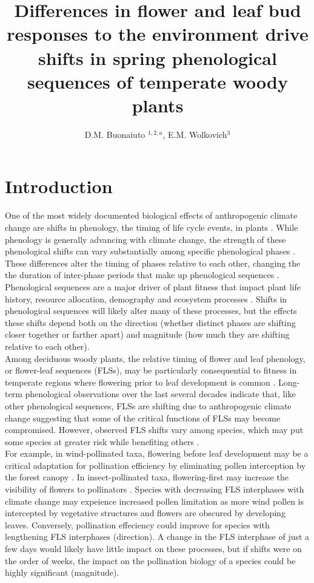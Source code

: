 \documentclass[11pt]{article}
\title{Differences in flower and leaf bud responses to the environment drive shifts in spring phenological sequences of temperate woody plants}\\
\date{}
\author{D.M. Buonaiuto $^{1,2,a}$, E.M. Wolkovich$^{3}$}
\begin{document}
\maketitle
\section*{Introduction}
One of the most widely documented biological effects of anthropogenic climate change are shifts in phenology, the timing of life cycle events, in plants \citep{}. While phenology is generally advancing with climate change, the strength of these phenological shifts can vary substantially among specific phenological phases \citep{}. These differences alter the timing of phases relative to each other, changing the the duration of inter-phase periods that make up phenological sequences \citep{}. Phenological sequences are a major driver of plant fitness that impact plant life history, resource allocation, demography and ecosystem processes \citep{}. Shifts in phenological sequences will likely alter many of these processes, but the effects these shifts depend both on the direction (whether distinct phases are shifting closer together or farther apart) and magnitude (how much they are shifting relative to each other).\\

Among deciduous woody plants, the relative timing of flower and leaf phenology, or flower-leaf sequences (FLSs), may be particularly consequential to fitness in temperate regions where flowering prior to leaf development is common \citep{Rathcke_1985,Gougherty2018}. Long-term phenological observations over the last several decades indicate that, like other phenological sequences, FLSs are shifting due to anthropogenic climate change \citep{Buonaiuto2020} suggesting that some of the critical functions of FLSs may become compromised. However, observed FLS shifts vary among species, which may put some species at greater risk while benefiting others \citep{Buonaiuto2020}.\\  

For example, in wind-pollinated taxa, flowering before leaf development may be a critical adaptation for pollination efficiency by eliminating pollen interception by the forest canopy \citep{Whitehead1969}. In insect-pollinated taxa, flowering-first may increase the visibility of flowers to pollinators \citep{Janzen1967,Savage2019}. Species with decreasing FLS interphases with climate change may expeience increased pollen limitation as more wind pollen is intercepted by vegetative structures and flowers are obscured by developing leaves. Conversely, pollination effeciency could improve for species with lengthening FLS interphases (direction). A change in the FLS interphase of just a few days would likely have little impact on these processes, but if shifts were on the order of weeks, the impact on the pollination biology of a species could be highly significant (magnitude).\\
\end{document}
